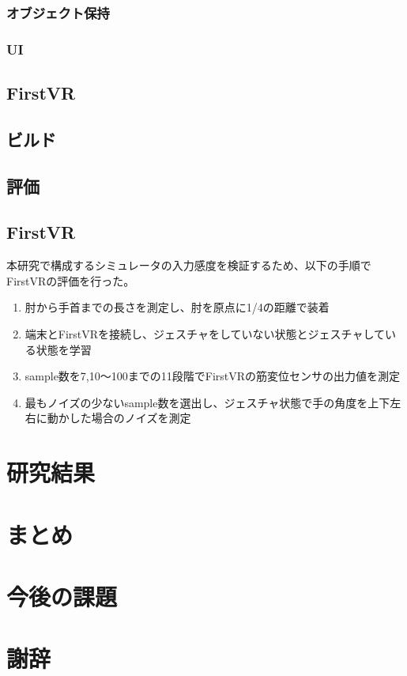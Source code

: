 \documentclass{ltjsreport}
\begin{document}
		\subsection{オブジェクト保持}
	
		\subsection{UI}
		

	\section{FirstVR}
		
	\section{ビルド}
	\section{評価}
		\section{FirstVR}
			本研究で構成するシミュレータの入力感度を検証するため、以下の手順でFirstVRの評価を行った。
			\begin{enumerate}
				\item 肘から手首までの長さを測定し、肘を原点に1/4の距離で装着
				\item 端末とFirstVRを接続し、ジェスチャをしていない状態とジェスチャしている状態を学習
				\item sample数を7,10〜100までの11段階でFirstVRの筋変位センサの出力値を測定
				\item 最もノイズの少ないsample数を選出し、ジェスチャ状態で手の角度を上下左右に動かした場合のノイズを測定
			\end{enumerate}
\chapter{研究結果}
\chapter{まとめ}

\chapter{今後の課題}
\clearpage

\chapter*{謝辞}
\end{document}
